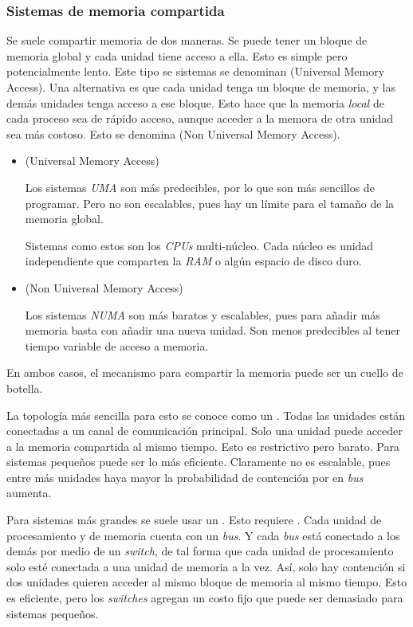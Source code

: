 \subsubsection{Sistemas de memoria compartida}

Se suele compartir memoria de dos maneras. Se puede tener un bloque de memoria
global y cada unidad tiene acceso a ella. Esto es simple pero potencialmente
lento. Este tipo se sistemas se denominan  (Universal Memory Access).
Una alternativa es que cada unidad tenga un bloque de memoria, y las demás
unidades tenga acceso a ese bloque. Esto hace que la memoria \emph{local}
de cada proceso sea de rápido acceso, aunque acceder a la memora de otra unidad
sea más costoso. Esto se denomina  (Non Universal Memory Access).

\begin{itemize}
\item {} (Universal Memory Access)

  Los sistemas \emph{UMA} son más predecibles, por lo que son más sencillos de
  programar. Pero no son escalables, pues hay un límite para el tamaño de la
  memoria global.

  Sistemas como estos son los \emph{CPUs} multi-núcleo. Cada núcleo es
  unidad independiente que comparten la \emph{RAM} o algún espacio de disco
  duro.

\item {} (Non Universal Memory Access)

  Los sistemas \emph{NUMA} son más baratos y escalables, pues para
  añadir más memoria basta con añadir una nueva unidad. Son menos predecibles
  al tener tiempo variable de acceso a memoria.

\end{itemize}

En ambos casos, el mecanismo para compartir la memoria puede ser un cuello de
botella.

La topología más sencilla para esto se conoce como un . Todas
las unidades están conectadas a un canal de comunicación principal. Solo una
unidad puede acceder a la memoria compartida al mismo tiempo. Esto es
restrictivo pero barato. Para sistemas pequeños puede ser lo más eficiente.
Claramente no es escalable, pues entre más unidades haya mayor la probabilidad
de contención por en \emph{bus} aumenta.

Para sistemas más grandes se suele usar un . Esto requiere
. Cada unidad de procesamiento y de memoria cuenta con un
\emph{bus}. Y cada \emph{bus} está conectado a los demás por medio de un
\emph{switch}, de tal forma que cada unidad de procesamiento solo esté
conectada a una unidad de memoria a la vez. Así, solo hay contención si dos
unidades quieren acceder al mismo bloque de memoria al mismo tiempo. Esto es
eficiente, pero los \emph{switches} agregan un costo fijo que puede ser
demasiado para sistemas pequeños.

